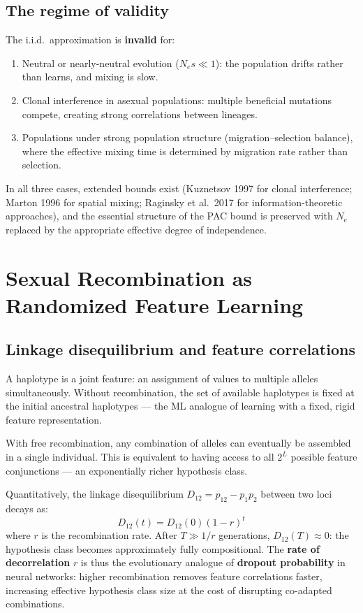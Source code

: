 \documentclass[12pt]{article}
\theoremstyle{remark}
\begin{document}
\subsection{The regime of validity}

The i.i.d.\ approximation is \textbf{invalid} for:
\begin{enumerate}
  \item Neutral or nearly-neutral evolution ($N_e s \ll 1$): the population drifts rather than learns, and mixing is slow.
  \item Clonal interference in asexual populations: multiple beneficial mutations compete, creating strong correlations between lineages.
  \item Populations under strong population structure (migration--selection balance), where the effective mixing time is determined by migration rate rather than selection.
\end{enumerate}
In all three cases, extended bounds exist (Kuznetsov 1997 for clonal interference; Marton 1996 for spatial mixing; Raginsky et al.\ 2017 for information-theoretic approaches), and the essential structure of the PAC bound is preserved with $N_e$ replaced by the appropriate effective degree of independence.

\section{Sexual Recombination as Randomized Feature Learning}

\subsection{Linkage disequilibrium and feature correlations}

A haplotype is a joint feature: an assignment of values to multiple alleles simultaneously. Without recombination, the set of available haplotypes is fixed at the initial ancestral haplotypes --- the ML analogue of learning with a fixed, rigid feature representation.

With free recombination, any combination of alleles can eventually be assembled in a single individual. This is equivalent to having access to all $2^L$ possible feature conjunctions --- an exponentially richer hypothesis class.

Quantitatively, the linkage disequilibrium $D_{12} = p_{12} - p_1 p_2$ between two loci decays as:
\[
  D_{12}(t) = D_{12}(0)(1-r)^t
\]
where $r$ is the recombination rate. After $T \gg 1/r$ generations, $D_{12}(T) \approx 0$: the hypothesis class becomes approximately fully compositional. The \textbf{rate of decorrelation} $r$ is thus the evolutionary analogue of \textbf{dropout probability} in neural networks: higher recombination removes feature correlations faster, increasing effective hypothesis class size at the cost of disrupting co-adapted combinations.
\end{document}
